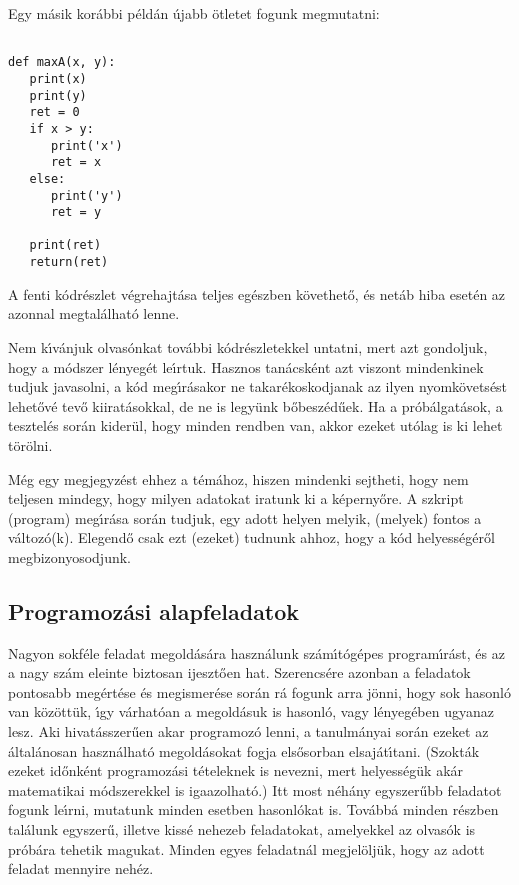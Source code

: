 \documentclass[12pt]{article}
\newcounter{feladat}
\newcounter{megold}
\begin{document}
Egy m\'asik kor\'abbi p\'eld\'an \'ujabb \"otletet fogunk megmutatni:

\begin{Verbatim}[fontsize=\small]

def maxA(x, y):
   print(x)
   print(y)
   ret = 0
   if x > y:
      print('x')
      ret = x
   else:
      print('y')
      ret = y

   print(ret)
   return(ret)

\end{Verbatim}

A fenti k\'odr\'eszlet v\'egrehajt\'asa teljes eg\'eszben k\"ovethet\H{o}, \'es net\'ab hiba eset\'en az azonnal 
megtal\'alhat\'o lenne.

Nem k\'{\i}v\'anjuk olvas\'onkat tov\'abbi k\'odr\'eszletekkel untatni, mert azt gondoljuk, hogy a m\'odszer 
l\'enyeg\'et le\'{\i}rtuk. Hasznos tan\'acsk\'ent azt viszont mindenkinek tudjuk javasolni, a k\'od meg\'{\i}r\'asakor  
ne takar\'ekoskodjanak az ilyen nyomk\"ovets\'est lehet\H{o}v\'e tev\H{o} kiirat\'asokkal, de ne is legy\"unk 
b\H{o}besz\'ed\H{u}ek. Ha a pr\'ob\'algat\'asok, a tesztel\'es sor\'an kider\"ul, hogy minden rendben van, 
akkor ezeket ut\'olag is ki lehet t\"or\"olni.

M\'eg egy megjegyz\'est ehhez a t\'em\'ahoz, hiszen mindenki sejtheti, hogy nem teljesen mindegy, hogy 
milyen adatokat iratunk ki a k\'eperny\H{o}re. A szkript (program) meg\'{\i}r\'asa sor\'an tudjuk, egy 
adott helyen melyik, (melyek) fontos a v\'altoz\'o(k). Elegend\H{o} csak ezt (ezeket) tudnunk ahhoz, hogy a 
k\'od helyess\'eg\'er\H{o}l megbizonyosodjunk.

\subsection{Programoz\'asi alapfeladatok}

Nagyon sokf\'ele feladat megold\'as\'ara haszn\'alunk sz\'am\'{\i}t\'og\'epes program\'{\i}r\'ast, \'es az a nagy 
sz\'am eleinte biztosan ijeszt\H{o}en hat. Szerencs\'ere azonban a feladatok pontosabb meg\'ert\'ese \'es megismer\'ese 
sor\'an r\'a fogunk arra j\"onni, hogy sok hasonl\'o van k\"oz\"ott\"uk, \'{\i}gy v\'arhat\'oan a megold\'asuk is 
hasonl\'o, vagy l\'enyeg\'eben ugyanaz lesz. Aki hivat\'asszer\H{u}en akar programoz\'o lenni, a tanulm\'anyai sor\'an 
ezeket az \'altal\'anosan haszn\'alhat\'o megold\'asokat fogja els\H{o}sorban elsaj\'at\'{\i}tani. (Szokt\'ak ezeket 
id\H{o}nk\'ent programoz\'asi t\'eteleknek is nevezni, mert helyess\'eg\"uk ak\'ar matematikai m\'odszerekkel is 
igaazolhat\'o.) Itt most n\'eh\'any egyszer\H{u}bb feladatot fogunk le\'{\i}rni, mutatunk minden esetben hasonl\'okat 
is. Tov\'abb\'a minden r\'eszben tal\'alunk egyszer\H{u}, illetve kiss\'e nehezeb feladatokat, amelyekkel az olvas\'ok 
is pr\'ob\'ara tehetik magukat. Minden egyes feladatn\'al megjel\"olj\"uk, hogy az adott feladat mennyire neh\'ez.
\end{document}
